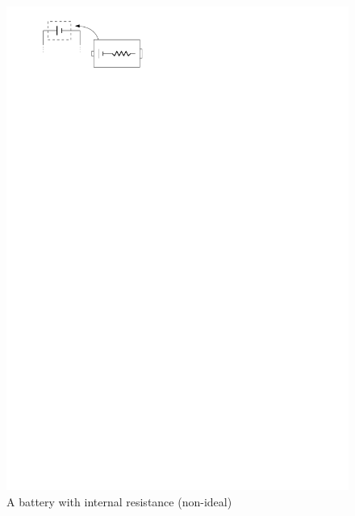\documentclass{article}
\begin{document}
\begin{itemize}
\begin{itemize}
\begin{figure}[H]
              \includegraphics{figures/ir-battery.pdf}
              \caption{A battery with internal resistance (non-ideal)}
            \end{figure}
        \end{itemize}
    \end{itemize}
\end{document}
